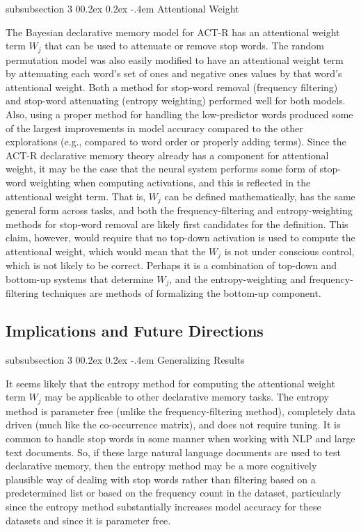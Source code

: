 \documentclass[man,donotrepeattitle]{apa6}
\makeatletter
\renewcommand{\subsubsection}{%
  \@startsection
  {subsubsection}%
  {3}%
  {\parindent}%
  {0\baselineskip \@plus 0.2ex \@minus 0.2ex}%
  {-.4em}%
  {\normalfont\normalsize\bfseries\addperi}}
\makeatother
\begin{document}
\subsubsection{Attentional Weight}

The Bayesian declarative memory model for ACT-R has an attentional weight term $W_{j}$ that can be used to attenuate or remove stop words.
The random permutation model was also easily modified to have an attentional weight term by attenuating each word's set of ones and negative ones values by that word's attentional weight.
Both a method for stop-word removal (frequency filtering) and stop-word attenuating (entropy weighting) performed well for both models.
Also, using a proper method for handling the low-predictor words produced some of the largest improvements in model accuracy compared to the other explorations
(e.g., compared to word order or properly adding terms).
Since the ACT-R declarative memory theory already has a component for attentional weight, it may be the case that the neural system performs some form of stop-word weighting when computing activations,
and this is reflected in the attentional weight term.
That is, $W_{j}$ can be defined mathematically, has the same general form across tasks, and both the frequency-filtering and entropy-weighting methods for stop-word removal are likely first candidates for the definition.
This claim, however, would require that no top-down activation is used to compute the attentional weight, which would mean that the $W_{j}$ is not under conscious control, which is not likely to be correct.
Perhaps it is a combination of top-down and bottom-up systems that determine $W_{j}$, and the entropy-weighting and frequency-filtering techniques are methods of formalizing the bottom-up component.

\subsection{Implications and Future Directions}

\subsubsection{Generalizing Results}

It seems likely that the entropy method for computing the attentional weight term $W_{j}$ may be applicable to other declarative memory tasks.
The entropy method is parameter free (unlike the frequency-filtering method), completely data driven (much like the co-occurrence matrix), and does not require tuning.
It is common to handle stop words in some manner when working with NLP and large text documents.
So, if these large natural language documents are used to test declarative memory, then the entropy method may be a more cognitively plausible way of dealing with stop words rather than 
filtering based on a predetermined list or based on the frequency count in the dataset, particularly since the entropy method substantially increases model accuracy for these datasets and since it is parameter free.
\end{document}

